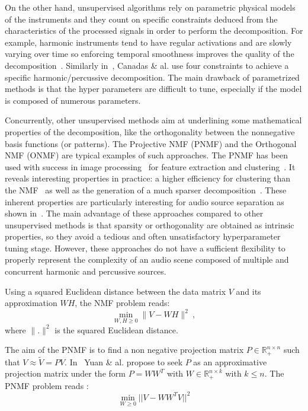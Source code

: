 On the other hand, unsupervised algorithms rely on parametric physical models of the instruments and they count on specific constraints deduced from the characteristics of the processed signals in order to perform the decomposition. For example, harmonic instruments tend to have regular activations and are slowly varying over time so enforcing temporal smoothness improves the quality of the decomposition~\cite{Virtanen}. Similarly in~\cite{canadas2014percussive}, Canadas \& al. use four constraints to achieve a specific harmonic/percussive decomposition. The main drawback of parametrized methods is that the hyper parameters are difficult to tune, especially if the model is composed of numerous parameters. 



Concurrently, other unsupervised methods aim at underlining some mathematical properties of the decomposition, like the orthogonality between the nonnegative basis functions (or patterns). The Projective NMF (PNMF) and the Orthogonal NMF (ONMF) are typical examples of such approaches. The PNMF has been used with success in image processing~\cite{choi} for feature extraction and clustering~\cite{YangOja10}. It reveals interesting properties in practice: a higher efficiency for clustering than the NMF~\cite{choi} as well as the generation of a much sparser decomposition~\cite{YangOja10}. These inherent properties are particularly interesting for audio source separation as shown in~\cite{canadas2014percussive}. 
The main advantage of these approaches compared to other unsupervised methods is that sparsity or orthogonality are obtained as intrinsic properties, so they avoid a tedious and often unsatisfactory hyperparameter tuning stage. However, these approaches do not have a sufficient flexibility to properly represent the complexity of an audio scene composed of multiple and concurrent harmonic and percussive sources.

Using a squared Euclidean distance between the data matrix $V$ and its approximation $WH$, the NMF problem reads:
$$
\min_{W,H\geq 0} \|V - WH\|^2\ , 
$$
where $\|.\|^{2}$ is the squared Euclidean distance.

The aim of the PNMF is to find a non negative projection matrix $P \in \mathbb{R}_{+}^{n \times n}$ such that $V \approx \tilde{V} = PV$. In~\cite{yuanOja2005} Yuan \& al. propose to seek $P$ as an approximative projection matrix under the form $P = WW^{T}$ with $W \in \mathbb{R}_{+}^{n \times k}$ with $ k \leqslant n $. The PNMF problem reads : 
\begin{equation}\label{EqPnmf}
\min_{W \geqslant 0} ||V - WW^{T}V||^2 
\end{equation}

